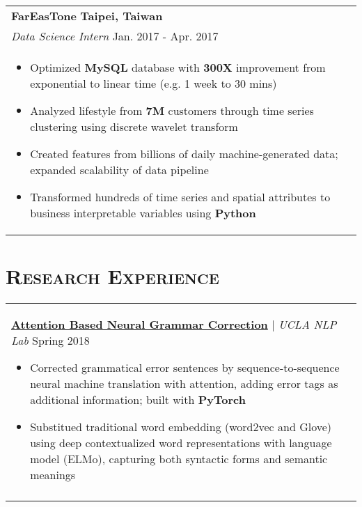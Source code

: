 \documentclass[letterpaper,11pt]{article} %
\begin{document}
{\begin{tabular}{p{18.5cm}}
{\bf{FarEasTone}} \hfill \bf{Taipei, Taiwan}\\
{\it Data Science Intern} \hfill  Jan. 2017 - Apr. 2017\\%
\begin{itemize}
\vspace{-3mm}
\item Optimized {\bf MySQL} database with {\bf300X} improvement from exponential to linear time (e.g. 1 week to 30 mins) 
\item Analyzed lifestyle from {\bf 7M} customers through time series clustering using discrete wavelet transform
\item Created features from billions of daily machine-generated data; expanded scalability of data pipeline 
\item Transformed hundreds of time series and spatial attributes to business interpretable variables using {\bf Python}
\vspace*{-\baselineskip}
\end{itemize} 
\vspace{.1mm}
\end{tabular}


\section{\Large\bf\textsc{Research Experience}}
\begin{tabular}{p{18.5cm}}

\href{}{\bf{Attention Based Neural Grammar Correction}} | {\it{UCLA NLP Lab}} \hfill Spring 2018
\begin{itemize}
\item Corrected grammatical error sentences by sequence-to-sequence neural machine translation with attention, adding error tags as additional information; built with {\bf PyTorch}
\item Substitued traditional word embedding (word2vec and Glove) using deep contextualized word representations with language model (ELMo), capturing both syntactic forms and semantic meanings \vspace*{-\baselineskip}
\end{itemize} \\
\vspace{.1mm}


\end{tabular}}
\end{document}

